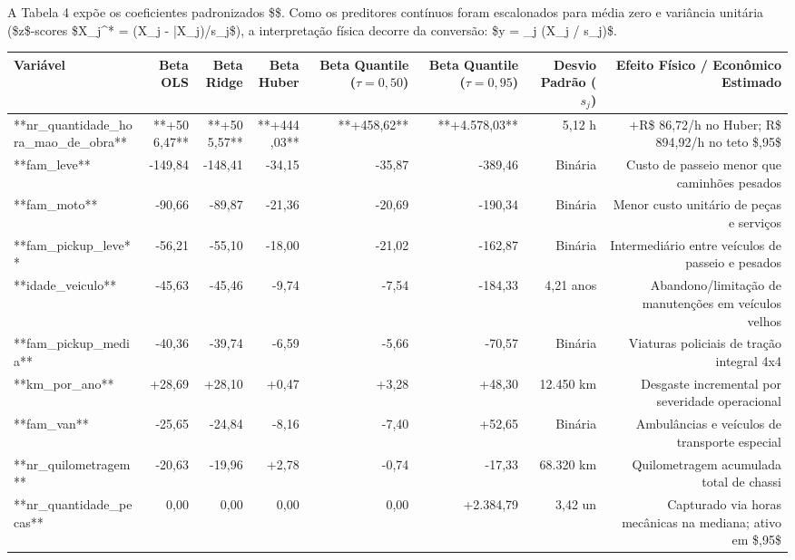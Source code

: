 \documentclass[12pt,a4paper]{article}
\begin{document}
A Tabela 4 expõe os coeficientes padronizados \$\beta\$. Como os preditores contínuos foram escalonados para média zero e variância unitária (\$z\$-scores \$X\_j^* = (X\_j - \bar{X}\_j)/s\_j\$), a interpretação física decorre da conversão: \$\Delta y = \beta\_j \cdot (\Delta X\_j / s\_j)\$.

\begin{table}[htbp]
\centering
\small
\begin{tabular}{lrrrrrrr}
\toprule
\textbf{Variável} & \textbf{Beta OLS} & \textbf{Beta Ridge} & \textbf{Beta Huber} & \textbf{Beta Quantile ($\tau=0,50$)} & \textbf{Beta Quantile ($\tau=0,95$)} & \textbf{Desvio Padrão ($s_j$)} & \textbf{Efeito Físico / Econômico Estimado} \\
\midrule
**nr\_quantidade\_hora\_mao\_de\_obra** & **+506,47** & **+505,57** & **+444,03** & **+458,62** & **+4.578,03** & 5,12 h & +R\$ 86,72/h no Huber; R\$ 894,92/h no teto \$\tau=0,95\$ \\
**fam\_leve** & -149,84 & -148,41 & -34,15 & -35,87 & -389,46 & Binária & Custo de passeio menor que caminhões pesados \\
**fam\_moto** & -90,66 & -89,87 & -21,36 & -20,69 & -190,34 & Binária & Menor custo unitário de peças e serviços \\
**fam\_pickup\_leve** & -56,21 & -55,10 & -18,00 & -21,02 & -162,87 & Binária & Intermediário entre veículos de passeio e pesados \\
**idade\_veiculo** & -45,63 & -45,46 & -9,74 & -7,54 & -184,33 & 4,21 anos & Abandono/limitação de manutenções em veículos velhos \\
**fam\_pickup\_media** & -40,36 & -39,74 & -6,59 & -5,66 & -70,57 & Binária & Viaturas policiais de tração integral 4x4 \\
**km\_por\_ano** & +28,69 & +28,10 & +0,47 & +3,28 & +48,30 & 12.450 km & Desgaste incremental por severidade operacional \\
**fam\_van** & -25,65 & -24,84 & -8,16 & -7,40 & +52,65 & Binária & Ambulâncias e veículos de transporte especial \\
**nr\_quilometragem** & -20,63 & -19,96 & +2,78 & -0,74 & -17,33 & 68.320 km & Quilometragem acumulada total de chassi \\
**nr\_quantidade\_pecas** & 0,00 & 0,00 & 0,00 & 0,00 & +2.384,79 & 3,42 un & Capturado via horas mecânicas na mediana; ativo em \$\tau=0,95\$ \\
\bottomrule
\end{tabular}
\end{table}
\end{document}
